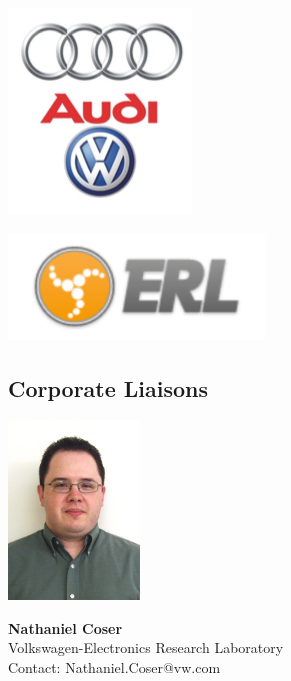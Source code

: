 \begin{center}
%
%
%

\includegraphics{Figures/Logos/AUDI}


\includegraphics{Figures/Logos/ERL}

\end{center}

\clearpage

\subsection{Corporate Liaisons}

\vspace{1em}
\noindent \includegraphics[width=35mm]{Figures/People/Nate}
\hspace{1em}\parbox[b]{0.6\textwidth}{\textbf{Nathaniel Coser}\\
Volkswagen-Electronics Research Laboratory\\
Contact: Nathaniel.Coser@vw.com\\
}
\vspace{2em}

